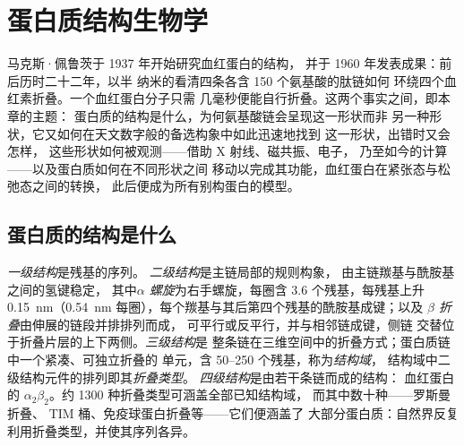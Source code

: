 \chapter{蛋白质结构生物学}\label{ch:b3:structural-biology}

马克斯·佩鲁茨于 1937 年开始研究血红蛋白的结构，
并于 1960 年发表成果：前后历时二十二年，以半
纳米的看清四条各含 150 个氨基酸的肽链如何
环绕四个血红素折叠。一个血红蛋白分子只需
几毫秒便能自行折叠。这两个事实之间，即本章的主题：
蛋白质的结构是什么，为何氨基酸链会呈现这一形状而非
另一种形状，它又如何在天文数字般的备选构象中如此迅速地找到
这一形状，出错时又会怎样，
这些形状如何被观测——借助 X 射线、磁共振、电子，
乃至如今的计算——以及蛋白质如何在不同形状之间
移动以完成其功能，血红蛋白在紧张态与松弛态之间的转换，
此后便成为所有别构蛋白的模型。

\section{蛋白质的结构是什么}

\begin{definition}[结构的层次]\label{def:b3:structural-biology:levels}
\emph{一级结构}是残基的序列。
\emph{二级结构}是主链局部的规则构象，
由主链羰基与酰胺基之间的氢键稳定，
其中\emph{$\alpha$ 螺旋}为右手螺旋，每圈含 $3.6$
个残基，每残基上升 \qty{0.15}{nm}（\qty{0.54}{nm}
每圈），每个羰基与其后第四个残基的酰胺基成键；以及
\emph{$\beta$ 折叠}由伸展的链段并排排列而成，
可平行或反平行，并与相邻链成键，侧链
交替位于折叠片层的上下两侧。\emph{三级结构}是
整条链在三维空间中的折叠方式；蛋白质链中一个紧凑、可独立折叠的
单元，含 \numrange{50}{250} 个残基，称为\emph{结构域}，
结构域中二级结构元件的排列即其\emph{折叠类型}。
\emph{四级结构}是由若干条链而成的结构：
血红蛋白的 $\alpha_{2}\beta_{2}$。约 \num{1300} 种折叠类型可涵盖全部已知结构域，
而其中数十种——罗斯曼折叠、
TIM 桶、免疫球蛋白折叠等——它们便涵盖了
大部分蛋白质：自然界反复利用折叠类型，并使其序列各异。
\end{definition}

